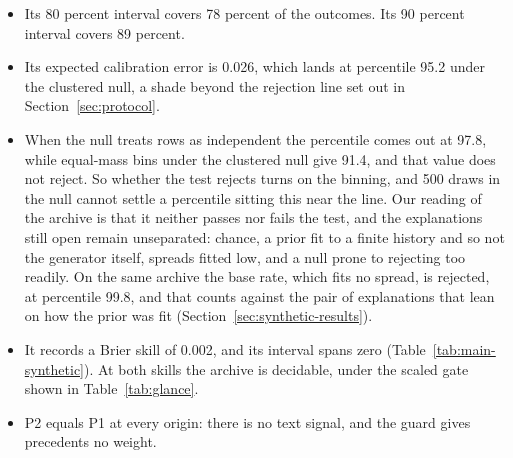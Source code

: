 \begin{itemize}
\item Its 80 percent interval covers 78 percent of the outcomes. Its 90 percent interval covers 89 percent.
\item Its expected calibration error is 0.026, which lands at percentile 95.2 under the clustered null, a shade beyond the rejection line set out in Section~\ref{sec:protocol}.
\item When the null treats rows as independent the percentile comes out at 97.8, while equal-mass bins under the clustered null give 91.4, and that value does not reject. So whether the test rejects turns on the binning, and 500 draws in the null cannot settle a percentile sitting this near the line. Our reading of the archive is that it neither passes nor fails the test, and the explanations still open remain unseparated: chance, a prior fit to a finite history and so not the generator itself, spreads fitted low, and a null prone to rejecting too readily. On the same archive the base rate, which fits no spread, is rejected, at percentile 99.8, and that counts against the pair of explanations that lean on how the prior was fit (Section~\ref{sec:synthetic-results}).
\item It records a Brier skill of 0.002, and its interval spans zero (Table~\ref{tab:main-synthetic}). At both skills the archive is decidable, under the scaled gate shown in Table~\ref{tab:glance}.
\item P2 equals P1 at every origin: there is no text signal, and the guard gives precedents no weight.

\end{itemize}
